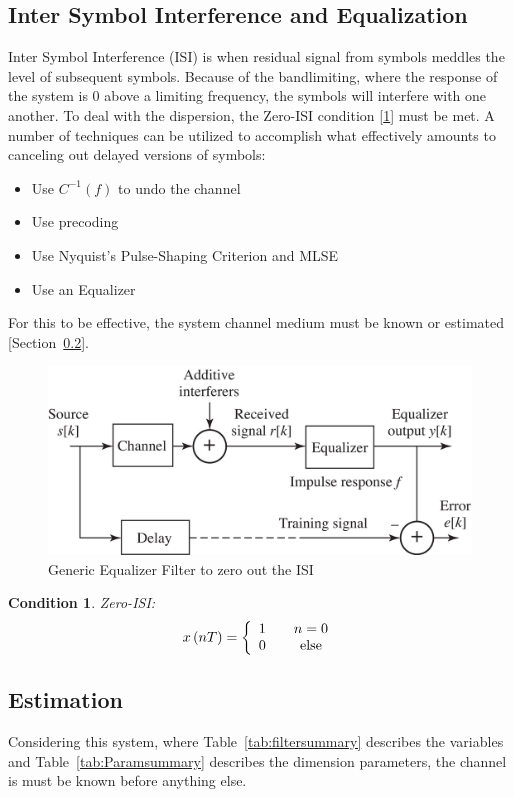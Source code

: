 \documentclass[]{article}
\newtheorem{thm}{Condition}
\begin{document}
\newpage
\subsection{Inter Symbol Interference and Equalization}
\label{sec:ISIbackground}
Inter Symbol Interference (ISI) is when residual signal from symbols meddles the level of subsequent symbols.  Because of the bandlimiting, where the response of the system is 0 above a limiting frequency, the symbols will interfere with one another. To deal with the dispersion, the Zero-ISI condition [\ref{thm:zero}] must be met.  A number of techniques can be utilized to accomplish what effectively amounts to canceling out delayed versions of symbols:

\begin{itemize}
\item Use $C^{-1}\left(f\right)$ to undo the channel
\item Use precoding
\item Use Nyquist's Pulse-Shaping Criterion and MLSE
\item Use an Equalizer
\end{itemize}
For this to be effective, the system channel medium must be known or estimated [Section~\ref{sec:estimate}].\\

\begin{figure}[b]
\centering
\includegraphics[width=.6\textwidth]{equalizer.png}
\caption{Generic Equalizer Filter to zero out the ISI\label{fig:equalizer}}
\end{figure}

\begin{thm}
\label{thm:zero}
Zero-ISI:
$$x\left(nT\right) = \left\{
\begin{array}{c c}
1 & \quad n=0 \\
0 & \quad \text{else}
\end{array} \right.$$
\end{thm}

\subsection{Estimation}
\label{sec:estimate}
Considering this system, where Table~\ref{tab:filtersummary} describes the variables and Table~\ref{tab:Paramsummary} describes the dimension parameters, the channel is must be known before anything else. \\
\end{document}
